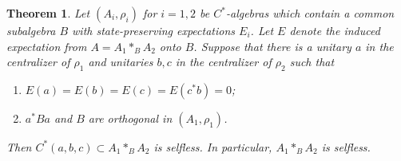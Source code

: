 \documentclass{amsart}
\newtheorem{theorem}{Theorem}[section]
\theoremstyle{definition}
\begin{document}
\begin{theorem}\label{thm: selfless-afp}
    Let $(A_i,\rho_i)$ for $i=1,2$ be $C^*$-algebras which contain a common subalgebra $B$ with state-preserving expectations $E_i$. Let $E$ denote the induced expectation from $A=A_1*_BA_2$ onto $B$. Suppose that there is a unitary $a$ in the centralizer of $\rho_1$ and unitaries $b,c$ in the centralizer of $\rho_2$ such that
    \begin{enumerate}
        \item $E(a) = E(b)=E(c)=E(c^*b)=0$;
        \item $a^*Ba$ and $B$ are orthogonal in $(A_1,\rho_1)$.
    \end{enumerate}
    Then $C^*(a,b,c) \subset A_1*_BA_2$ is selfless. In particular, $A_1*_B A_2$ is selfless.
\end{theorem}
\end{document}
